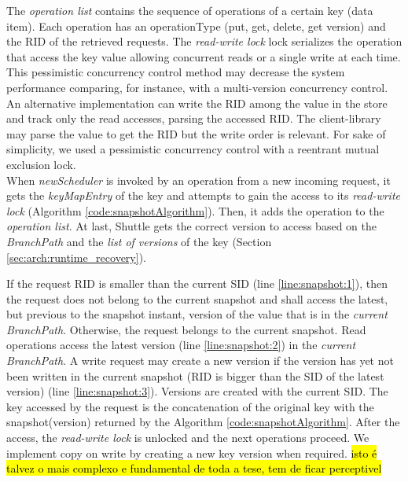 The \emph{operation list} contains the sequence of operations of a certain key (data item). Each operation has an operationType (put, get, delete, get version) and the \ac{RID} of the retrieved requests. The \emph{read-write lock} lock serializes the operation that access the key value allowing concurrent reads or a single write at each time. This pessimistic concurrency control method may decrease the system performance comparing, for instance, with a multi-version concurrency control. An alternative implementation can write the \ac{RID} among the value in the store and track only the read accesses, parsing the accessed \ac{RID}. The client-library may parse the value to get the \ac{RID} but the write order is relevant. For sake of simplicity, we used a pessimistic concurrency control with a reentrant mutual exclusion lock.\\

When \emph{newScheduler} is invoked by an operation from a new incoming request, it gets the \emph{keyMapEntry} of the key and attempts to gain the access to its \emph{read-write lock} (Algorithm \ref{code:snapshotAlgorithm}). Then, it adds the operation to the \emph{operation list}. At last, Shuttle gets the correct version to access based on the \emph{BranchPath} and the \emph{list of versions} of the key (Section \ref{sec:arch:runtime_recovery}). 

If the request \ac{RID} is smaller than the current \acf{SID} (line \ref{line:snapshot:1}), then the request does not belong to the current snapshot and shall access the latest, but previous to the snapshot instant, version of the value that is in the  \textit{current BranchPath}. Otherwise, the request belongs to the current snapshot. Read operations access the latest version (line \ref{line:snapshot:2}) in the  \textit{current BranchPath}. A write request may create a new version if the version has yet not been written in the current snapshot (\ac{RID} is bigger than the \ac{SID} of the latest version) (line \ref{line:snapshot:3}). Versions are created with the current \acf{SID}. The key accessed by the request is the concatenation of the original key with the snapshot(version) returned by the Algorithm \ref{code:snapshotAlgorithm}. After the access, the \emph{read-write lock} is unlocked and the next operations proceed. We implement copy on write by creating a new key version when required. \hl{isto é talvez o mais complexo e fundamental de toda a tese, tem de ficar perceptivel}


